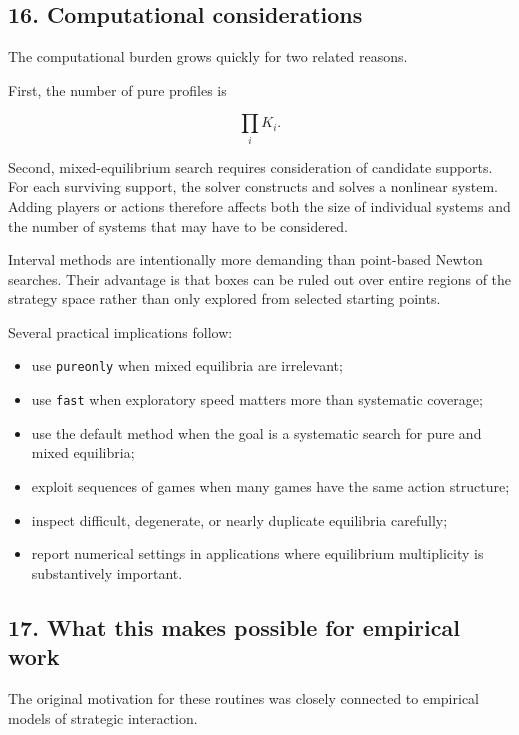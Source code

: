 \documentclass[11pt]{article}
\providecommand{\tightlist}{%
      \setlength{\itemsep}{0pt}\setlength{\parskip}{0pt}}
\begin{document}
    \hypertarget{computational-considerations}{%
\subsection{16. Computational
considerations}\label{computational-considerations}}

The computational burden grows quickly for two related reasons.

First, the number of pure profiles is

\[
\prod_i K_i.
\]

Second, mixed-equilibrium search requires consideration of candidate
supports. For each surviving support, the solver constructs and solves a
nonlinear system. Adding players or actions therefore affects both the
size of individual systems and the number of systems that may have to be
considered.

Interval methods are intentionally more demanding than point-based
Newton searches. Their advantage is that boxes can be ruled out over
entire regions of the strategy space rather than only explored from
selected starting points.

Several practical implications follow:

\begin{itemize}
\tightlist
\item
  use \texttt{pureonly} when mixed equilibria are irrelevant;
\item
  use \texttt{fast} when exploratory speed matters more than systematic
  coverage;
\item
  use the default method when the goal is a systematic search for pure
  and mixed equilibria;
\item
  exploit sequences of games when many games have the same action
  structure;
\item
  inspect difficult, degenerate, or nearly duplicate equilibria
  carefully;
\item
  report numerical settings in applications where equilibrium
  multiplicity is substantively important.
\end{itemize}

    \hypertarget{what-this-makes-possible-for-empirical-work}{%
\subsection{17. What this makes possible for empirical
work}\label{what-this-makes-possible-for-empirical-work}}

The original motivation for these routines was closely connected to
empirical models of strategic interaction.
\end{document}
